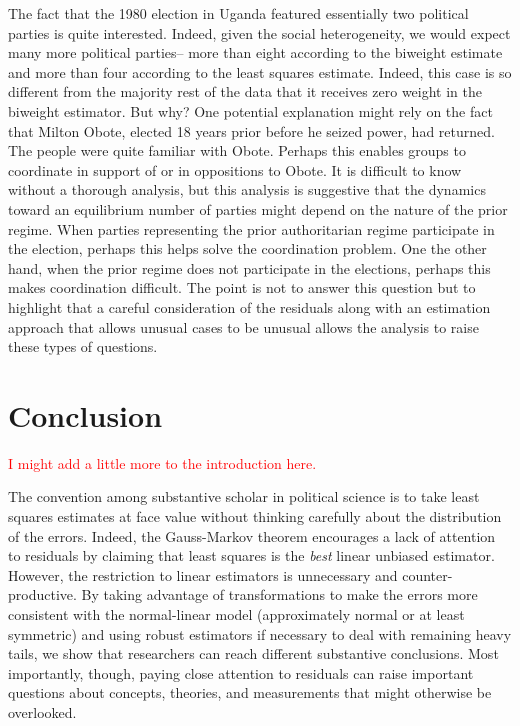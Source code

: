 \documentclass[12pt]{article}
\newcommand{\ctk}[1]{\textcolor{red}{#1}}
\begin{document}
The fact that the 1980 election in Uganda featured essentially two political parties is quite interested. Indeed, given the social heterogeneity, we would expect many more political parties-- more than eight according to the biweight estimate and more than four according to the least squares estimate. 
Indeed, this case is so different from the majority rest of the data that it receives zero weight in the biweight estimator. 
But why? 
One potential explanation might rely on the fact that Milton Obote, elected 18 years prior before he seized power, had returned. 
The people were quite familiar with Obote. 
Perhaps this enables groups to coordinate in support of or in oppositions to Obote. 
It is difficult to know without a thorough analysis, but this analysis is suggestive that the dynamics toward an equilibrium number of parties might depend on the nature of the prior regime. 
When parties representing the prior authoritarian regime participate in the election, perhaps this helps solve the coordination problem. 
One the other hand, when the prior regime does not participate in the elections, perhaps this makes coordination difficult. 
The point is not to answer this question but to highlight that a careful consideration of the residuals along with an estimation approach that allows unusual cases to be unusual allows the analysis to raise these types of questions.

\section*{Conclusion}

\ctk{I might add a little more to the introduction here.}

The convention among substantive scholar in political science is to take least squares estimates at face value without thinking carefully about the distribution of the errors. 
Indeed,  the Gauss-Markov theorem encourages a lack of attention to residuals by claiming that least squares is the \textit{best} linear unbiased estimator. 
However, the restriction to linear estimators is unnecessary and counter-productive. 
By taking advantage of transformations to make the errors more consistent with the normal-linear model (approximately normal or at least symmetric) and using robust estimators if necessary to deal with remaining heavy tails, we show that researchers can reach different substantive conclusions. 
Most importantly, though, paying close attention to residuals can raise important questions about concepts, theories, and measurements that might otherwise be overlooked. 
\end{document}
